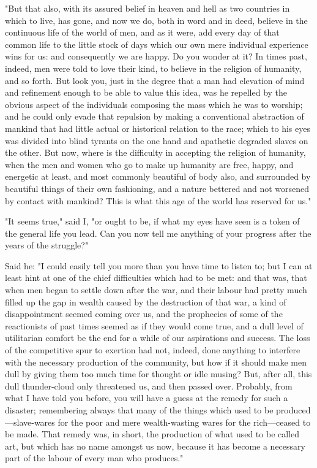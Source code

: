 "But that also, with its assured belief in heaven and hell as two
countries in which to live, has gone, and now we do, both in word and in
deed, believe in the continuous life of the world of men, and as it
were, add every day of that common life to the little stock of days
which our own mere individual experience wins for us: and consequently
we are happy. Do you wonder at it? In times past, indeed, men were told
to love their kind, to believe in the religion of humanity, and so
forth. But look you, just in the degree that a man had elevation of mind
and refinement enough to be able to value this idea, was he repelled by
the obvious aspect of the individuals composing the mass which he was to
worship; and he could only evade that repulsion by making a conventional
abstraction of mankind that had little actual or historical relation to
the race; which to his eyes was divided into blind tyrants on the one
hand and apathetic degraded slaves on the other. But now, where is the
difficulty in accepting the religion of humanity, when the men and women
who go to make up humanity are free, happy, and energetic at least, and
most commonly beautiful of body also, and surrounded by beautiful things
of their own fashioning, and a nature bettered and not worsened by
contact with mankind? This is what this age of the world has reserved
for us."

"It seems true," said I, "or ought to be, if what my eyes have seen is a
token of the general life you lead. Can you now tell me anything of your
progress after the years of the struggle?"

Said he: "I could easily tell you more than you have time to listen to;
but I can at least hint at one of the chief difficulties which had to be
met: and that was, that when men began to settle down after the war, and
their labour had pretty much filled up the gap in wealth caused by the
destruction of that war, a kind of disappointment seemed coming over us,
and the prophecies of some of the reactionists of past times seemed as
if they would come true, and a dull level of utilitarian comfort be the
end for a while of our aspirations and success. The loss of the
competitive spur to exertion had not, indeed, done anything to interfere
with the necessary production of the community, but how if it should
make men dull by giving them too much time for thought or idle musing?
But, after all, this dull thunder-cloud only threatened us, and then
passed over. Probably, from what I have told you before, you will have a
guess at the remedy for such a disaster; remembering always that many of
the things which used to be produced---slave-wares for the poor and mere
wealth-wasting wares for the rich---ceased to be made. That remedy was,
in short, the production of what used to be called art, but which has no
name amongst us now, because it has become a necessary part of the
labour of every man who produces."

